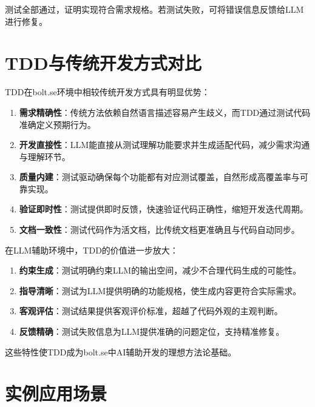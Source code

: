 测试全部通过，证明实现符合需求规格。若测试失败，可将错误信息反馈给LLM进行修复。

\section{TDD与传统开发方式对比}

TDD在bolt.se环境中相较传统开发方式具有明显优势：

\begin{enumerate}
  \item \textbf{需求精确性}：传统方法依赖自然语言描述容易产生歧义，而TDD通过测试代码准确定义预期行为。
  
  \item \textbf{开发直接性}：LLM能直接从测试理解功能要求并生成适配代码，减少需求沟通与理解环节。
  
  \item \textbf{质量内建}：测试驱动确保每个功能都有对应测试覆盖，自然形成高覆盖率与可靠实现。
  
  \item \textbf{验证即时性}：测试提供即时反馈，快速验证代码正确性，缩短开发迭代周期。
  
  \item \textbf{文档一致性}：测试代码作为活文档，比传统文档更准确且与代码自动同步。
\end{enumerate}

在LLM辅助环境中，TDD的价值进一步放大：

\begin{enumerate}
  \item \textbf{约束生成}：测试明确约束LLM的输出空间，减少不合理代码生成的可能性。
  
  \item \textbf{指导清晰}：测试为LLM提供明确的功能规格，使生成内容更符合实际需求。
  
  \item \textbf{客观评估}：测试结果提供客观评价标准，超越了代码外观的主观判断。
  
  \item \textbf{反馈精确}：测试失败信息为LLM提供准确的问题定位，支持精准修复。
\end{enumerate}

这些特性使TDD成为bolt.se中AI辅助开发的理想方法论基础。

\section{实例应用场景}
\label{sec:tdd-example}

